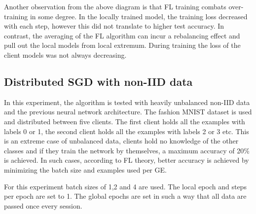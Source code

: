 \medskip
Another observation from the above diagram is that FL training combats over-training in some degree. In the locally trained model, the training loss decreased with each step, however this did not translate to higher test accuracy. In contrast, the averaging of the FL algorithm can incur a rebalancing effect and pull out the local models from local extremum. During training the loss of the client models was not always decreasing.

\clearpage

\subsection{Distributed SGD with non-IID data}
In this experiment, the algorithm is tested with heavily unbalanced non-IID data and the previous neural network architecture. The fashion MNIST dataset is used and distributed between five clients. The first client holds all the examples with labels 0 or 1, the second client holds all the examples with labels 2 or 3 etc. This is an extreme case of unbalanced data, clients hold no knowledge of the other classes and if they train the network by themselves, a maximum accuracy of 20\% is achieved. In such cases, according to FL theory, better accuracy is achieved by minimizing the batch size and examples used per GE.

\medskip
For this experiment batch sizes of 1,2 and 4 are used. The local epoch and steps per epoch are set to 1. The global epochs are set in such a way that all data are passed once every session.

